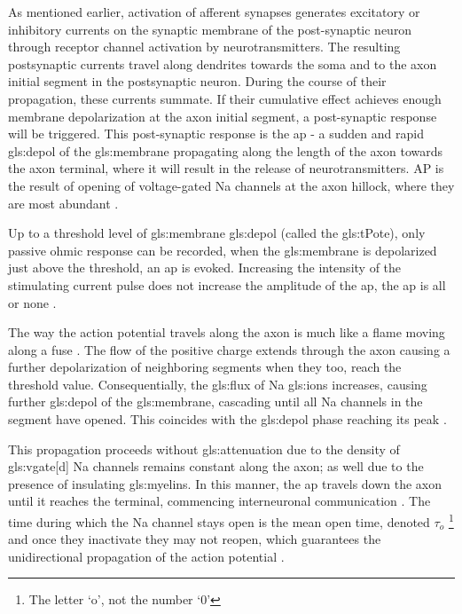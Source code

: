 \documentclass[class={myRUCProject}, crop=false]{standalone}
\begin{document}
As mentioned earlier, activation of afferent synapses generates excitatory or inhibitory currents on the synaptic membrane of the post-synaptic neuron through receptor channel activation by neurotransmitters. The resulting postsynaptic currents travel along dendrites towards the soma and to the axon initial segment in the postsynaptic neuron. During the course of their propagation, these currents summate. If their cumulative effect achieves enough membrane depolarization at the axon initial segment, a post-synaptic response will be triggered. This post-synaptic response is the  \gls{ap} -  a sudden and rapid \gls{gls:depol} of the \gls{gls:membrane} propagating along the length of the axon towards the axon terminal, where it will result in the release of neurotransmitters. AP is the result of opening of voltage-gated \gls{Na} channels at the axon hillock, where they are most abundant \cite{Hammond2015ch13}. 


Up to a threshold level of \gls{gls:membrane} \gls{gls:depol} (called the \gls{gls:tPote}), only passive ohmic response can be recorded, when the \gls{gls:membrane} is depolarized just above the threshold, an \gls{ap} is evoked. 
Increasing the intensity of the stimulating current pulse does not increase the amplitude of the \gls{ap}, the \gls{ap} is all or none \cite{Hammond2015ch4,kandel2000principles}. 

The way the action potential travels along the axon is much like a flame moving along a fuse \cite{wood1996neuroscience}. The flow of the positive charge extends through the axon causing a further depolarization of neighboring segments when they too, reach the threshold value. Consequentially, the \gls{gls:flux} of \gls{Na} \glspl{gls:ion} increases, causing further \gls{gls:depol} of the \gls{gls:membrane}, cascading until all \gls{Na} channels in the segment have opened.  This coincides with the \gls{gls:depol} phase reaching its peak \cite{Hammond2015ch4}.  

This propagation proceeds without \gls{gls:attenuation} due to the density of \gls{gls:vgate}[d] \gls{Na} channels remains constant along the axon; as well due to the presence of insulating \glspl{gls:myelin}.  In this manner, the  \gls{ap} travels down the axon until it reaches the terminal, commencing interneuronal communication \cite{wood1996neuroscience}. The time during which the \gls{Na} channel stays open is the mean open time, denoted \(\tau_o\) \cite{Hammond2015ch4}\footnote{The letter  `o', not the number `0'} and once they inactivate they may not reopen, which guarantees the unidirectional propagation of the action potential \cite{Hammond2015ch4}. 
\end{document}
